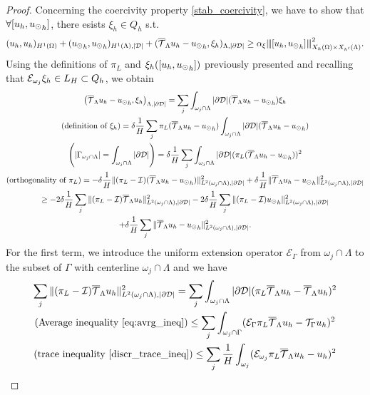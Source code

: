 \begin{proof} 
Concerning the coercivity property \eqref{stab_coercivity}, we have to show that $\forall [u_h, {u_{\odot}}_h]$, there esists $\xi_h \in Q_h$ s.t.
\begin{equation*}
(u_h,u_h)_{H^1(\Omega)}+ ({u_{\odot}}_h, {u_{\odot}}_h)_{H^1(\Lambda), |\mathcal{D}|} +   ({\overline{\mathcal{T}}_\Lambda} u_h - {u_{\odot}}_h, \xi_h)_{\Lambda,|\partial\mathcal{D}|} \geq \alpha_{\xi}{\left\vert\kern-0.25ex\left\vert\kern-0.25ex\left\vert [u_h, {u_{\odot}}_h] \right\vert\kern-0.25ex\right\vert\kern-0.25ex\right\vert}^2_{X_h(\Omega)\times X_{h'}(\Lambda) }.
\end{equation*}
Using the definitions of $\pi_L$ and $\xi_h([u_h, {u_{\odot}}_h])$ previously presented and recalling that $\mathcal{E}_{\omega _j}\xi_h\in L_H \subset Q_h$, we obtain
\begin{multline*}
\left( {\overline{\mathcal{T}}_\Lambda} u_h - {u_{\odot}}_h, \xi _h \right)_{\Lambda,|\partial\mathcal{D}|} 
= \sum_j \int_{\omega _j\cap \Lambda} |\partial\mathcal{D}|({\overline{\mathcal{T}}_\Lambda} u_h - {u_{\odot}}_h)\xi_h
\\
(\text{definition of $\xi_h$})= \delta \frac{1}{H}\sum_j \pi_L( {\overline{\mathcal{T}}_\Lambda} u_h - {u_{\odot}}_h)\int_{\omega _j\cap \Lambda} |\partial\mathcal{D}|({\overline{\mathcal{T}}_\Lambda} u_h - {u_{\odot}}_h)
\\
\left(|\Gamma_{\omega_j \cap \Lambda}| = \int_{\omega_j \cap \Lambda}|\partial\mathcal{D}|\right)= \delta \frac{1}{H} \sum_j \int_{\omega _j\cap \Lambda}|\partial\mathcal{D}| (\pi_L( {\overline{\mathcal{T}}_\Lambda} u_h - {u_{\odot}}_h) )^2
\\
(\text{orthogonality of $\pi_L$}) = - \delta \frac{1}{H} \|(\pi_L-\mathcal{I})({\overline{\mathcal{T}}_\Lambda} u_h - {u_{\odot}}_h)\|^2_{L^2(\omega _j\cap \Lambda),|\partial\mathcal{D}|} + \delta \frac{1}{H} \|{\overline{\mathcal{T}}_\Lambda} u_h - {u_{\odot}}_h\|^2_{L^2(\omega _j\cap \Lambda),|\partial\mathcal{D}|}
\\ 
\geq -2\delta \frac 1H \sum_j \|(\pi_L - \mathcal{I}){\overline{\mathcal{T}}_\Lambda} u_h\|^2_{L^2(\omega _j\cap \Lambda), |\partial\mathcal{D}|}
-2 \delta \frac 1H \sum_j \|(\pi_L - \mathcal{I}){u_{\odot}}_h\|^2_{L^2(\omega _j\cap \Lambda),|\partial\mathcal{D}|}
\\ 
+ \delta \frac 1H \sum_j \|{\overline{\mathcal{T}}_\Lambda} u_h-{u_{\odot}}_h\|^2_{L^2(\omega _j\cap \Lambda),|\partial\mathcal{D}|}. 
\end{multline*}
For the first term, we introduce the uniform extension operator  $\mathcal{E}_{\Gamma}$ from $\omega_j \cap \Lambda$ to the subset of $\Gamma$ with centerline $\omega_j \cap \Lambda$ and we have
\begin{multline*}
\sum _j  \|(\pi_L - \mathcal{I})\mtrace u_h\|^2_{L^2(\patch\cap \Lambda),|\DD|} =\sum _j \int _{\patch \cap \Lambda} |\DD| (\pi_L \mtrace u_h- \mtrace u_h)^2
\\
(\text{Average inequality \eqref{eq:avrg_ineq}}) \leq \sum _j  \int_{\omega _j \cap \Gamma} (\ext \pi_L \mtrace u_h -\trace u_h)^2 
\\
(\text{trace inequality \eqref{discr_trace_ineq}}) \leq \sum _j  \frac 1H \int_{\omega_j}(\mathcal{E}_{\patch} \pi_L \mtrace u_h - u_h)^2 

\end{multline*}
\end{proof}
